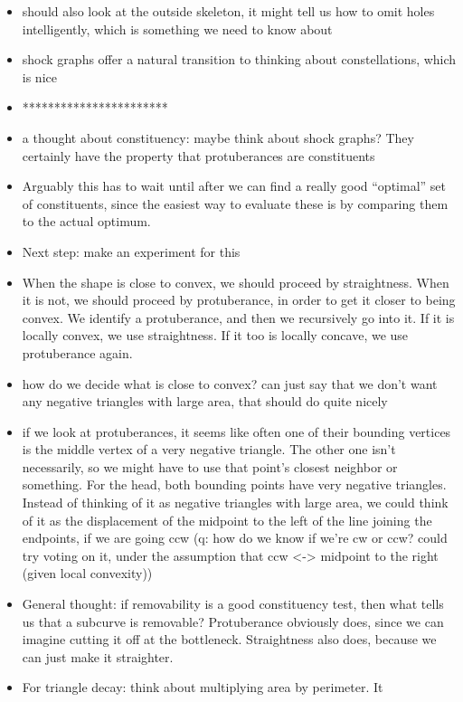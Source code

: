 \documentclass{book}
\begin{document}
\begin{itemize}
\item should also look at the outside skeleton, it might tell us how to
    omit holes intelligently, which is something we need to know about
\item shock graphs offer a natural transition to thinking about
    constellations, which is nice
\item ***********************
\item a thought about constituency: maybe think about shock graphs? They
    certainly have the property that protuberances are constituents
\item Arguably this has to wait until after we can find a really good
    ``optimal'' set of constituents, since the easiest way to evaluate
    these is by comparing them to the actual optimum.
\item Next step: make an experiment for this
\item When the shape is close to convex, we should proceed by
    straightness. When it is not, we should proceed by protuberance,
    in order to get it closer to being convex. We identify a
    protuberance, and then we recursively go into it. If it is locally
    convex, we use straightness. If it too is locally concave, we use
    protuberance again.
\item how do we decide what is close to convex? can just say that we
    don't want any negative triangles with large area, that should do
    quite nicely
\item if we look at protuberances, it seems like often one of their
    bounding vertices is the middle vertex of a very negative
    triangle. The other one isn't necessarily, so we might have to use
    that point's closest neighbor or something. For the head, both
    bounding points have very negative triangles. Instead of thinking
    of it as negative triangles with large area, we could think of it
    as the displacement of the midpoint to the left of the line
    joining the endpoints, if we are going ccw (q: how do we know if
    we're cw or ccw? could try voting on it, under the assumption that
    ccw <-> midpoint to the right (given local convexity))
\item General thought: if removability is a good constituency test, then
    what tells us that a subcurve is removable? Protuberance obviously
    does, since we can imagine cutting it off at the bottleneck.
    Straightness also does, because we can just make it straighter.
\item For triangle decay: think about multiplying area by perimeter. It

\end{itemize}
\end{document}
